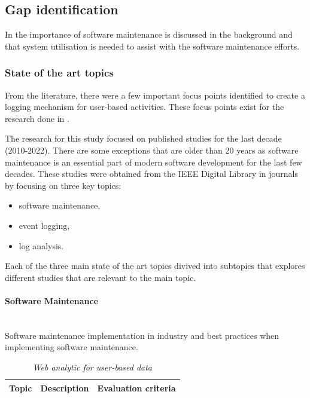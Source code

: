 \clearpage

\subsection{Gap identification}
In  the importance of software maintenance is discussed in the background and that system utilisation is needed to assist with the software maintenance efforts.

\subsubsection{State of the art topics}
From the literature, there were a few important focus points identified to create a logging mechanism for user-based activities. These focus points exist for the research done in .\par The research for this study focused on published studies for the last decade (2010-2022). There are some exceptions that are older than 20 years as software maintenance is an essential part of modern software development for the last few decades. These studies were obtained from the IEEE Digital Library in journals by focusing on three key topics:

\begin{itemize}
	\item software maintenance,
	\item event logging,
	\item log analysis.
\end{itemize}

Each of the three main state of the art topics divived into subtopics that explores different studies that are relevant to the main topic.

\paragraph{Software Maintenance}\leavevmode\\
Software maintenance implementation in industry and best practices when implementing software maintenance.

\begin{table}[!htb]
	\centering
	\caption[Software maintenance state of the art topics]
	{\textit{Web analytic for user-based data}}
	\label{tbl:ch1_soaSoftwareMaintennace}
	\begin{tabularx}{\textwidth}{|l|X|X|}
		\hline \textbf{Topic}  & \textbf{Description} & \textbf{Evaluation criteria}\\
		\hline
	\end{tabularx}
\end{table}

